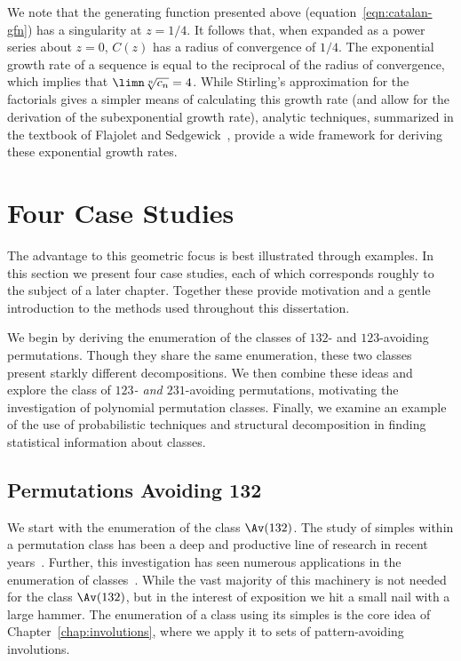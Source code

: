\documentclass[12pt,twoside]{memoir}
\begin{document}
      We note that the generating function presented above
      (equation~\ref{eqn:catalan-gfn}) has a singularity at $z=1/4$. It follows
      that, when expanded as a power series about $z=0$, $C(z)$ has a radius of
      convergence of $1/4$. The exponential growth rate of a sequence is equal to
      the reciprocal of the radius of convergence, which implies that $\limn
      \sqrt[n]{c_n} = 4$. 
      While Stirling's approximation for the factorials gives a simpler means of
      calculating this growth rate (and allow for the derivation of the
      subexponential growth rate), analytic techniques, summarized in the
      textbook of Flajolet and Sedgewick~\cite{flajolet}, provide a wide
      framework for deriving these exponential growth rates.




  \section{Four Case Studies}


    The advantage to this geometric focus is best illustrated through 
    examples. In this section we present four case studies, each of which
    corresponds roughly to the subject of a later chapter. Together these provide
    motivation and a gentle introduction to the methods used throughout this
    dissertation.
    
    We begin by deriving the 
    enumeration of the classes of $132$- and $123$-avoiding permutations. Though
    they share the same enumeration, these two classes present starkly different
    decompositions. We then combine these ideas and explore the class of
    \emph{$123$- and $231$}-avoiding permutations, motivating the investigation
    of polynomial permutation classes. Finally, we examine an example of the use of
    probabilistic techniques and structural decomposition in finding
    statistical information about classes. 



    \subsection{Permutations Avoiding 132}
    \label{prelim:sec:av132}

      
      We start with the enumeration of the class $\Av (132)$.  The study of
      simples within a permutation class has been a deep and productive line of
      research in recent years~\cite{Brignall2008, Atkinson2005, Brignall2007}.  
      Further, this investigation has seen numerous applications in the
      enumeration of classes~\cite{pantone2013,pantone2014, Albert2012}.
      While the vast majority of this machinery is not needed for the class $\Av
      (132)$, but in the interest of exposition we hit a small nail with a large
      hammer.  The enumeration of a class using its simples is the core idea of
      Chapter~\ref{chap:involutions}, where we apply it to sets of
      pattern-avoiding involutions. 
      
\end{document}
